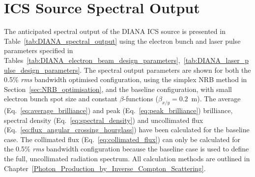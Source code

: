 \documentclass[../main.tex]{subfiles}
\begin{document}
\section{ICS Source Spectral Output}
\label{sec:DIANA_spectral_output}

The anticipated spectral output of the DIANA ICS source is presented in Table~\ref{tab:DIANA_spectral_output} using the electron bunch and laser pulse parameters specified in Tables~\ref{tab:DIANA_electron_beam_design_parameters},~\ref{tab:DIANA_laser_pulse_design_parameters}. The spectral output parameters are shown for both the 0.5\% \textit{rms} bandwidth optimised configuration, using the simplex NRB method in Section~\ref{sec:NRB_optimisation}, and the baseline configuration, with small electron bunch spot size and constant $\beta$-functions ($\beta_{x/y}=0.2$~\si{\meter}). The average (Eq.~\ref{eq:average_brilliance}) and peak (Eq.~\ref{eq:peak_brilliance}) brilliance, spectral density (Eq.~\ref{eq:spectral_density}) and uncollimated flux (Eq.~\ref{eq:flux_angular_crossing_hourglass}) have been calculated for the baseline case. The collimated flux (Eq.~\ref{eq:collimated_flux}) can only be calculated for the 0.5\% \textit{rms} bandwidth configuration because the baseline case is used to define the full, uncollimated radiation spectrum. All calculation methods are outlined in Chapter~\ref{Photon_Production_by_Inverse_Compton_Scattering}. 
\end{document}
